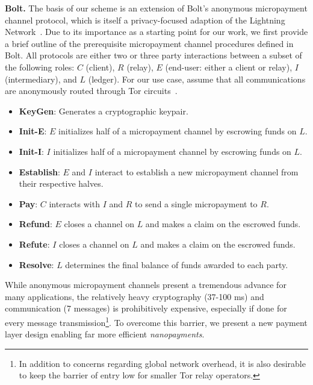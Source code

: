 \medskip \noindent\textbf{Bolt.} The basis of our scheme is an extension of Bolt's anonymous micropayment channel protocol, which is itself a privacy-focused adaption of the Lightning Network~\cite{poon2016bitcoin}.
Due to its importance as a starting point for our work, we first provide a brief outline of the prerequisite micropayment channel procedures defined in Bolt.
All protocols are either two or three party interactions between a subset of the following roles: $C$ (client), $R$ (relay), $E$ (end-user: either a client or relay), $I$ (intermediary), and $L$ (ledger).
For our use case, assume that all communications are anonymously routed through Tor circuits~\cite{green2017bolt}.

\begin{itemize}[label={}]
\item \textbf{KeyGen}: Generates a cryptographic keypair.
\item \textbf{Init-E}: $E$ initializes half of a micropayment channel by
  escrowing funds on $L$.
\item \textbf{Init-I}: $I$ initializes half of a micropayment channel by
  escrowing funds on $L$.
\item \textbf{Establish}: $E$ and $I$ interact to establish a new micropayment
  channel from their respective halves.
\item \textbf{Pay}: $C$ interacts with $I$ and $R$ to send a single micropayment to $R$.
\item \textbf{Refund}: $E$ closes a channel on $L$ and makes a claim on
  the escrowed funds.
\item \textbf{Refute}: $I$ closes a channel on $L$ and makes a claim on
  the escrowed funds.
\item \textbf{Resolve}: $L$ determines the final balance of funds awarded to
  each party.
\end{itemize}

While anonymous micropayment channels present a tremendous advance for many applications, the relatively heavy cryptography (37-100 ms) and communication (7 messages) is prohibitively expensive, especially if done for every message transmission\footnote{In addition to concerns regarding global network overhead, it is also desirable to keep the barrier of entry low for smaller Tor relay operators.}.
To overcome this barrier, we present a new payment layer design enabling far more efficient \emph{nanopayments}.

